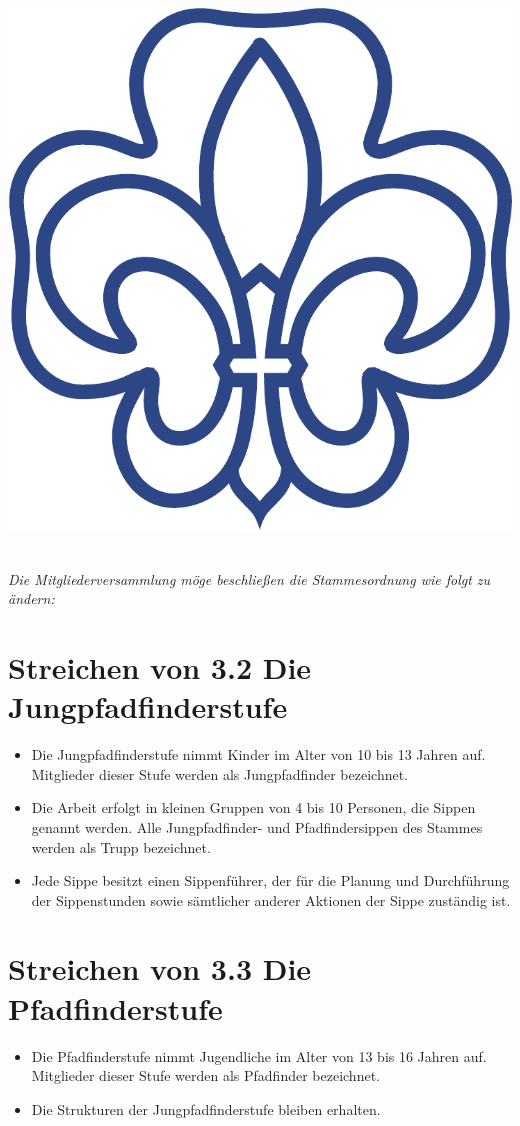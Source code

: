 \documentclass[a4paper]{article}
\begin{document}
\begin{center}
\begin{minipage}{.2\textwidth}
        \includegraphics[width=.85\linewidth]{Zeichen.pdf}
    \end{minipage}%
\end{center}
~\\[0.5cm] 

\emph{Die Mitgliederversammlung möge beschließen die Stammesordnung wie folgt zu ändern:}

\section{Streichen von 3.2 Die Jungpfadfinderstufe}
    \begin{itemize}
        \item Die Jungpfadfinderstufe nimmt Kinder im Alter von 10 bis 13 Jahren auf. Mitglieder dieser
Stufe werden als Jungpfadfinder bezeichnet.
        \item Die Arbeit erfolgt in kleinen Gruppen von 4 bis 10 Personen, die Sippen genannt werden. Alle
Jungpfadfinder- und Pfadfindersippen des Stammes werden als Trupp bezeichnet.
        \item Jede Sippe besitzt einen Sippenführer, der für die Planung und Durchführung der
Sippenstunden sowie sämtlicher anderer Aktionen der Sippe zuständig ist.
    \end{itemize}

\section{Streichen von 3.3 Die Pfadfinderstufe}
    \begin{itemize}
        \item Die Pfadfinderstufe nimmt Jugendliche im Alter von 13 bis 16 Jahren auf. Mitglieder dieser
Stufe werden als Pfadfinder bezeichnet.
        \item Die Strukturen der Jungpfadfinderstufe bleiben erhalten.
    \end{itemize}
\end{document}
